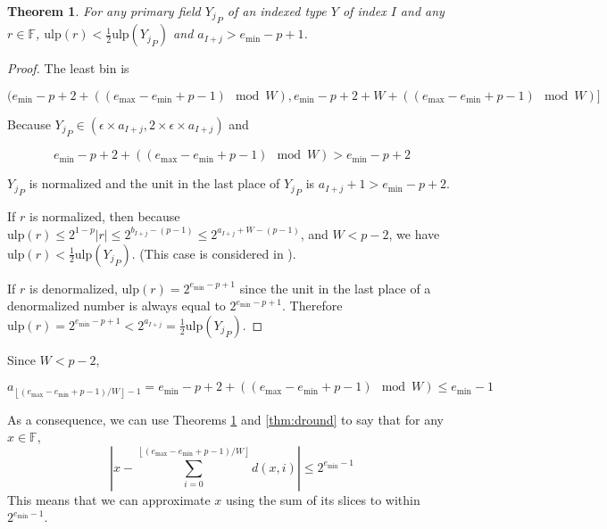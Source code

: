 \documentclass[12pt]{article}
\providecommand{\floor}[1]{\left \lfloor #1 \right \rfloor }
\providecommand{\F}{\ensuremath{\mathbb{F}}}
\providecommand{\min}{\ensuremath{\text{min}}}
\providecommand{\max}{\ensuremath{\text{max}}}
\providecommand{\ulp}{\ensuremath{\text{ulp}}}
\theoremstyle{plain}
\newtheorem{thm}{Theorem}[section]
\numberwithin{equation}{section}
\begin{document}
      \begin{thm}
        For any primary field ${Y_j}_P$ of an indexed type $Y$ of index $I$ and any $r \in \F$, $\ulp(r) < \frac{1}{2}\ulp({Y_j}_P)$ and $a_{I + j} > e_{\min} - p + 1$.
        \label{thm:underflowulp}
      \end{thm}
      \begin{proof}
      The least bin is

      \begin{equation*}
      (e_{\min} - p + 2 + ((e_{\max} - e_{\min} + p - 1 ) \mod W), e_{\min} - p + 2 + W + ((e_{\max} - e_{\min} + p - 1)\mod W)]
      \end{equation*}

      Because ${Y_j}_P \in (\epsilon \times a_{I + j}, 2 \times \epsilon \times a_{I + j})$ and

      \begin{equation*}
      e_{\min} - p + 2 + ((e_{\max} - e_{\min} + p- 1) \mod W) > e_{\min} - p + 2
      \end{equation*}

      ${Y_j}_P$ is normalized and the unit in the last place of ${Y_j}_P$ is $a_{I + j} + 1 > e_{\min} - p + 2$.

      If $r$ is normalized, then because $\ulp(r) \leq 2^{1 - p}|r| \leq 2^{b_{I + j} - (p - 1)} \leq 2^{a_{I + j} + W - (p - 1)}$, and $W < p - 2$, we have $\ulp(r) < \frac{1}{2}\ulp({Y_j}_P)$. (This case is considered in \cite{repsum}).

      If $r$ is denormalized, $\ulp(r) = 2^{e_{\min} - p + 1}$ since the unit in the last place of a denormalized number is always equal to $2^{e_{\min} - p + 1}$. Therefore $\ulp(r) = 2^{e_{\min} - p + 1} < 2^{a_{I + j}} = \frac{1}{2}\ulp({Y_j}_P)$.
      \end{proof}

      Since $W < p - 2$,

      \begin{equation*}
        a_{\floor{(e_{\max} - e_{\min} + p - 1)/W} - 1} = e_{\min} - p + 2 + ((e_{\max} - e_{\min} + p - 1 ) \mod W) \leq {e_{\min} - 1}
      \end{equation*}

      As a consequence, we can use Theorems \ref{thm:underflowulp} and \ref{thm:dround} to say that for any $x \in \F$,
      \begin{equation*}
        |x - \sum\limits_{i = 0}^{\floor{(e_{\max} - e_{\min} + p - 1)/W}} d(x, i)| \leq 2^{e_{\min} - 1}
      \end{equation*}
      This means that we can approximate $x$ using the sum of its slices to within $2^{e_{\min} - 1}$.
\end{document}
